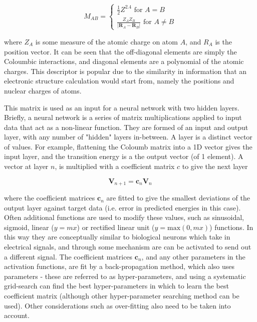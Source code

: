 \begin{equation}
	M_{AB} = 
	  \begin{cases}
		\frac{1}{2} Z^{2.4} \text{ for } A = B\\
		\frac{Z_A Z_B}{\left\lvert \mathbf{R}_A - \mathbf{R}_B\right\rvert} \text{ for } A \neq B
	  \end{cases}
\end{equation}

where $Z_A$ is some measure of the atomic charge on atom $A$, and $R_A$ is the position
vector. It can be seen that the off-diagonal elements are simply the Coloumbic interactions,
and diagonal elements are a polynomial of the atomic charges. This descriptor is
popular due to the similarity in information that an electronic structure calculation
would start from, namely the positions and nuclear charges of atoms.

This matrix is used as an input for a neural network with two hidden layers. Briefly,
a neural network is a series of matrix multiplications applied to input data that
act as a non-linear function. They are formed of an input and output layer, with 
any number of "hidden" layers in-between. A layer is a distinct vector of values.
For example, flattening the Coloumb matrix into a 1D vector gives the input layer,
and the \Qy transition energy is a the output vector (of 1 element). A vector at
layer $n$, is multiplied with a coefficient matrix $c$ to give the next layer

\begin{equation}
	\mathbf{V}_{n+1} = \mathbf{c}_n \mathbf{V}_n	
\end{equation}

where the coefficient matrices $\mathbf{c}_n$ are fitted to give the smallest deviations
of the output layer against target data (i.e. error in predicted \Qy energies in 
this case). Often additional functions are used to modify these values, such as
sinusoidal, sigmoid, linear ($y=mx$) or rectified linear unit ($y=\text{max}\left(0, mx \right)$)
functions. In this way they are conceptually similar to biological neurons which
take in electrical signals, and through some mechanism are can be activated to send
out a different signal. The coefficient matrices $\mathbf{c}_n$, and any other parameters
in the activation functions, are fit by a back-propagation method, which also uses
parameters - these are referred to as hyper-parameters, and using a systematic grid-search
can find the best hyper-parameters in which to learn the best coefficient matrix
(although other hyper-parameter searching method can be used). Other considerations
such as over-fitting also need to be taken into account.

